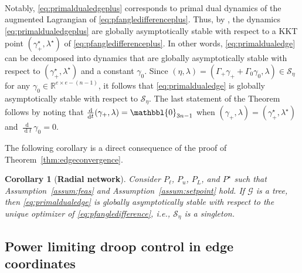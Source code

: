 \documentclass[twocolumn,twoside,journal]{IEEEtran}
\DeclareMathOperator{\diff}{d}
\newcommand{\mc}{\mathcal}
\newcommand{\ddt}{\tfrac{\diff}{\diff \!t}}
\newcommand\red[1]{{\color{red}#1}}
\newtheorem{corollary}{Corollary}
\begin{document}
\begin{IEEEproof}
\begin{subequations}
\begin{align}
\end{align}
\end{subequations}
Notably, \eqref{eq:primaldualedgeplus} corresponds to primal dual dynamics of the augmented Lagrangian of \eqref{eq:pfangledifferenceplus}. Thus, by \cite[Theorem~4.5]{ashish}, the dynamics \eqref{eq:primaldualedgeplus} are globally asymptotically stable with respect to a KKT point $(\gamma^\star_+,\lambda^\star)$ of \eqref{eq:pfangledifferenceplus}. In other words, \eqref{eq:primaldualedge} can be decomposed into dynamics that are globally asymptotically stable with respect to $(\gamma^\star_+,\lambda^\star)$ and a constant $\gamma_0$. Since $(\eta,\lambda) = (\Gamma_+ \gamma_+ + \Gamma_0 \gamma_0,\lambda) \in \mc S_\eta$ for any $\gamma_0 \in \mathbb{R}^{e \times e-(n-1)}$, it follows that \eqref{eq:primaldualedge} is globally asymptotically stable with respect to $\mc S_\eta$. The last statement of the Theorem follows by noting that $\ddt (\gamma_+,\lambda)=\mathbbl{0}_{3n-1}$ when $(\gamma_+,\lambda)=(\gamma^\star_+,\lambda^\star)$ and $\ddt \gamma_0=0$.
\end{IEEEproof}
%
The following corollary is a direct consequence of the proof of Theorem~\ref{thm:edgeconvergence}.
%
\begin{corollary}[\textbf{Radial network}]
    Consider $P_\ell$, $P_u$, $P_L$, and $P^\star$ such that Assumption~\ref{assum:feas} and Assumption~\ref{assum:setpoint} hold. If $\mc G$ is a tree, then \eqref{eq:primaldualedge} is globally asymptotically stable with respect to the unique optimizer of \eqref{eq:pfangledifference}, i.e., $\mc S_\eta$ is a singleton.
\end{corollary}


\subsection{Power limiting droop control in edge coordinates}
\end{document}

